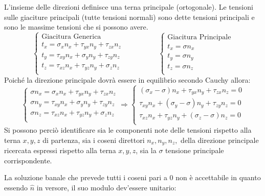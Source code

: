 \documentclass{article}
\begin{document}
\begin{adjustwidth}{2in}{}
	L’insieme delle direzioni definisce una terna principale (ortogonale).
	Le tensioni sulle giaciture principali (tutte tensioni normali) sono dette tensioni
	principali e sono le massime tensioni che si possono avere.
	 \[
	\begin{cases} \text{Giacitura Generica}\\
		t_x = \sigma_x n_x + \tau_{yx}n_y + \tau_{zx}n_z \\
		t_y = \tau_{xy}n_x + \sigma_y n_y + \tau_{zy}n_z \\
		t_z = \tau_{xz}n_x + \tau_{yz}n_y + \sigma_z n_z \\
	\end{cases} \hspace{2cm} 	\begin{cases} \text{Giacitura Principale}\\
	t_x = \sigma n_x  \\
	t_y = \sigma n_y  \\
	t_z = \sigma n_z  \\
\end{cases}
	\]
	Poiché la direzione principale dovrà essere in equilibrio secondo Cauchy allora:
	\[
		\begin{cases}
		\sigma n_x = \sigma_x n_x + \tau_{yx}n_y + \tau_{zx}n_z \\
	    \sigma n_y = \tau_{xy}n_x + \sigma_y n_y + \tau_{zy}n_z \\
		\sigma n_z = \tau_{xz}n_x + \tau_{yz}n_y + \sigma_z n_z \\
	\end{cases} \Rightarrow  	\begin{cases}
	 (\sigma_x -\sigma) n_x + \tau_{yx}n_y + \tau_{zx}n_z = 0 \\
	 \tau_{xy}n_x + (\sigma_y - \sigma) n_y + \tau_{zy}n_z = 0 \\
	 \tau_{xz}n_x + \tau_{yz}n_y + (\sigma_z - \sigma) n_z = 0\\
\end{cases}
	\]
	Si possono perciò identificare sia le componenti note delle tensioni rispetto alla terna $ x,y,z $ di partenza, sia i coseni direttori $ n_x, n_y, n_z, $ della direzione principale ricercata espressi
	rispetto alla terna $ x,y,z $, sia la $ \sigma $ tensione principale corrispondente. \newline
	
	La soluzione banale che prevede tutti i coseni pari a $ 0 $ non è accettabile in quanto essendo $\hat{n}$ in versore, il suo modulo dev'essere unitario:
	

\end{adjustwidth}
\end{document}
